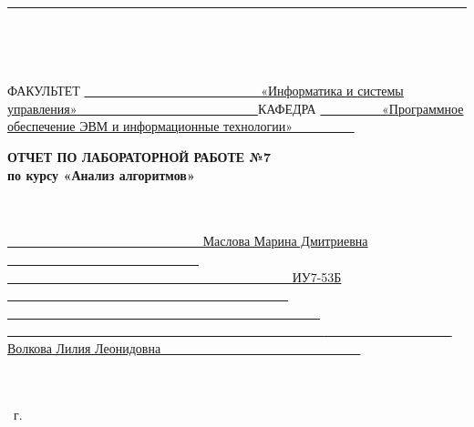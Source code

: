 \begin{titlepage}
    \noindent
	\rule{17cm}{3pt}
    ~\\
    \begin{spacing}{0.1}
        ~\\
    \end{spacing}
	\noindent ФАКУЛЬТЕТ
    \uline
    {
            ~~~~~~~~~~~~~~~~~~~~~~~~~~~
            «Информатика и системы управления»
            ~~~~~~~~~~~~~~~~~~~~~~~~~~~
    }
    \newline\newline
	\noindent КАФЕДРА
    \uline{
            ~~~~~~~~~
            «Программное обеспечение ЭВМ и информационные технологии»
            ~~~~~~~~~
        }
    \newline\newline
    \newline\newline
    \newline\newline
    \newline\newline
    \newline

	\fontsize{18pt}{18pt}\selectfont
	\begin{center}
        \textbf{ОТЧЕТ ПО ЛАБОРАТОРНОЙ РАБОТЕ №7}\\
        \textbf{по курсу «Анализ алгоритмов»}\\
        ~\\
        \fontsize{16pt}{16pt}\selectfont
	\end{center}
    ~\\

	\fontsize{14pt}{14pt}\selectfont
	\noindent{}
    \uline{
        ~~~~~~~~~~~~~~~~~~~~~~~~~~~~~~
        Маслова Марина Дмитриевна
        ~~~~~~~~~~~~~~~~~~~~~~~~~~~~~~
    }
    \newline\newline
	\noindent{}
    \uline{
        ~~~~~~~~~~~~~~~~~~~~~~~~~~~~~~~~~~~~~~~~~~~~
        ИУ7-53Б
        ~~~~~~~~~~~~~~~~~~~~~~~~~~~~~~~~~~~~~~~~~~~~
    }
    \newline\newline
	\noindent{}
    \uline{
        ~~~~~~~~~~~~~~~~~~~~~~~~~~~~~~~~~~~~~~~~~~~~~~~~~
        ~~~~~~~~~~~~~~~~~~~~~~~~~~~~~~~~~~~~~~~~~~~~~~~~~
    }
    \newline\newline
	\noindent{}
    \uline{
        ~~~~~~~~~~~~~~~~~~~~
        Волкова Лилия Леонидовна
        ~~~~~~~~~~~~~~~~~~~~~~~~~~~~~~
    }
    \newline\newline
    ~\\
    ~\\
    ~\\
    \vspace{17mm}

	\begin{center}
		\the\year~г.
	\end{center}

    \restoregeometry
\end{titlepage}
